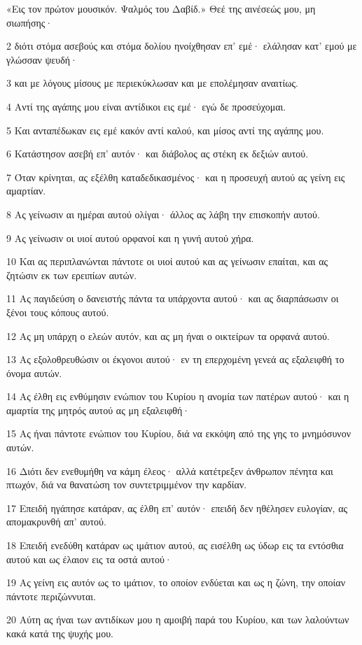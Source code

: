 \par «Εις τον πρώτον μουσικόν. Ψαλμός του Δαβίδ.» Θεέ της αινέσεώς μου, μη σιωπήσης·
\par 2 διότι στόμα ασεβούς και στόμα δολίου ηνοίχθησαν επ' εμέ· ελάλησαν κατ' εμού με γλώσσαν ψευδή·
\par 3 και με λόγους μίσους με περιεκύκλωσαν και με επολέμησαν αναιτίως.
\par 4 Αντί της αγάπης μου είναι αντίδικοι εις εμέ· εγώ δε προσεύχομαι.
\par 5 Και ανταπέδωκαν εις εμέ κακόν αντί καλού, και μίσος αντί της αγάπης μου.
\par 6 Κατάστησον ασεβή επ' αυτόν· και διάβολος ας στέκη εκ δεξιών αυτού.
\par 7 Όταν κρίνηται, ας εξέλθη καταδεδικασμένος· και η προσευχή αυτού ας γείνη εις αμαρτίαν.
\par 8 Ας γείνωσιν αι ημέραι αυτού ολίγαι· άλλος ας λάβη την επισκοπήν αυτού.
\par 9 Ας γείνωσιν οι υιοί αυτού ορφανοί και η γυνή αυτού χήρα.
\par 10 Και ας περιπλανώνται πάντοτε οι υιοί αυτού και ας γείνωσιν επαίται, και ας ζητώσιν εκ των ερειπίων αυτών.
\par 11 Ας παγιδεύση ο δανειστής πάντα τα υπάρχοντα αυτού· και ας διαρπάσωσιν οι ξένοι τους κόπους αυτού.
\par 12 Ας μη υπάρχη ο ελεών αυτόν, και ας μη ήναι ο οικτείρων τα ορφανά αυτού.
\par 13 Ας εξολοθρευθώσιν οι έκγονοι αυτού· εν τη επερχομένη γενεά ας εξαλειφθή το όνομα αυτών.
\par 14 Ας έλθη εις ενθύμησιν ενώπιον του Κυρίου η ανομία των πατέρων αυτού· και η αμαρτία της μητρός αυτού ας μη εξαλειφθή·
\par 15 Ας ήναι πάντοτε ενώπιον του Κυρίου, διά να εκκόψη από της γης το μνημόσυνον αυτών.
\par 16 Διότι δεν ενεθυμήθη να κάμη έλεος· αλλά κατέτρεξεν άνθρωπον πένητα και πτωχόν, διά να θανατώση τον συντετριμμένον την καρδίαν.
\par 17 Επειδή ηγάπησε κατάραν, ας έλθη επ' αυτόν· επειδή δεν ηθέλησεν ευλογίαν, ας απομακρυνθή απ' αυτού.
\par 18 Επειδή ενεδύθη κατάραν ως ιμάτιον αυτού, ας εισέλθη ως ύδωρ εις τα εντόσθια αυτού και ως έλαιον εις τα οστά αυτού·
\par 19 Ας γείνη εις αυτόν ως το ιμάτιον, το οποίον ενδύεται και ως η ζώνη, την οποίαν πάντοτε περιζώννυται.
\par 20 Αύτη ας ήναι των αντιδίκων μου η αμοιβή παρά του Κυρίου, και των λαλούντων κακά κατά της ψυχής μου.
